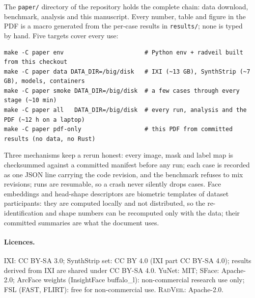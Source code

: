 \documentclass[11pt]{article}
\newcommand{\rv}{\textsc{RadVeil}}
\newcommand{\code}[1]{\texttt{#1}}
\begin{document}
The \code{paper/} directory of the repository holds the complete chain:
data download, benchmark, analysis and this manuscript. Every number,
table and figure in the PDF is a macro generated from the per-case results
in \code{results/}; none is typed by hand. Five targets cover every use:

{\footnotesize\begin{verbatim}
make -C paper env                       # Python env + radveil built from this checkout
make -C paper data DATA_DIR=/big/disk   # IXI (~13 GB), SynthStrip (~7 GB), models, containers
make -C paper smoke DATA_DIR=/big/disk  # a few cases through every stage (~10 min)
make -C paper all   DATA_DIR=/big/disk  # every run, analysis and the PDF (~12 h on a laptop)
make -C paper pdf-only                  # this PDF from committed results (no data, no Rust)
\end{verbatim}}

\noindent Three mechanisms keep a rerun honest: every image, mask and label
map is checksummed against a committed manifest before any run; each case is
recorded as one JSON line carrying the code revision, and the benchmark
refuses to mix revisions; runs are resumable, so a crash never silently
drops cases. Face embeddings and
head-shape descriptors are biometric templates of dataset participants: they
are computed locally and not distributed, so the re-identification and
shape numbers can be recomputed only with the data; their committed
summaries are what the document uses.

\paragraph{Licences.} IXI: CC BY-SA 3.0; SynthStrip set: CC BY 4.0 (IXI
part CC BY-SA 4.0); results derived from IXI are shared under CC BY-SA 4.0.
YuNet: MIT; SFace: Apache-2.0; ArcFace weights (InsightFace buffalo\_l):
non-commercial research use only; FSL (FAST, FLIRT): free for non-commercial
use. \rv: Apache-2.0.

\clearpage  %


\end{document}
